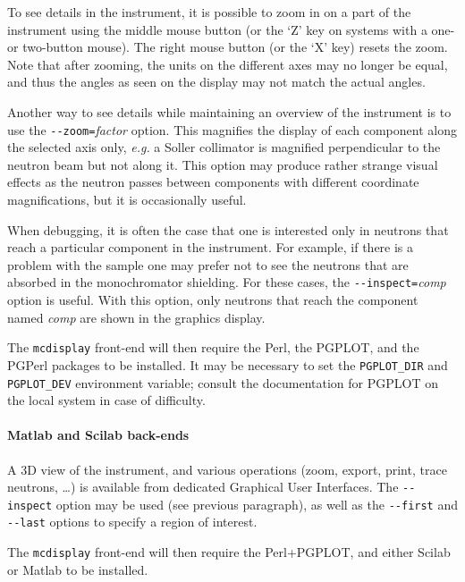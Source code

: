To see details in the instrument, it is possible to zoom in on a part of
the instrument using the middle mouse button (or the `Z' key on systems
with a one- or two-button mouse). The right mouse button (or the `X'
key) resets the zoom. Note that after zooming, the units on the
different axes may no longer be equal, and thus the angles as seen on
the display may not match the actual angles.

Another way to see details while maintaining an overview of the
instrument is to use the \verb+--zoom=+\textit{factor} option. This
magnifies the display of each component along the selected axis only,
{\em e.g.} a Soller collimator is magnified perpendicular to the neutron beam
but not along it. This option may produce rather strange visual effects
as the neutron passes between components with different coordinate
magnifications, but it is occasionally useful.

When debugging, it is often the case that one is interested only in
neutrons that reach a particular component in the instrument. For
example, if there is a problem with the sample one may prefer not to see
the neutrons that are absorbed in the monochromator shielding. For these
cases, the \verb+--inspect=+\textit{comp\/} option is useful. With this
option, only neutrons that reach the component named \textit{comp\/} are
shown in the graphics display.

The \verb+mcdisplay+ front-end will then require the Perl, the PGPLOT, and the
PGPerl packages to be installed. It may be necessary to set the
\verb+PGPLOT_DIR+ and \verb+PGPLOT_DEV+ environment variable; consult the
documentation for PGPLOT on the local system in case of difficulty.
  

\paragraph{Matlab and Scilab back-ends}

A 3D view of the instrument, and various operations (zoom, export, print, trace neutrons, \ldots) is available from dedicated Graphical User Interfaces.
The \verb+--inspect+ option may be used (see previous paragraph), as well as the \verb+--first+ and \verb+--last+ options to specify a region of interest.

The \verb+mcdisplay+ front-end will then
require the Perl+PGPLOT, and either Scilab or Matlab to be installed.  

